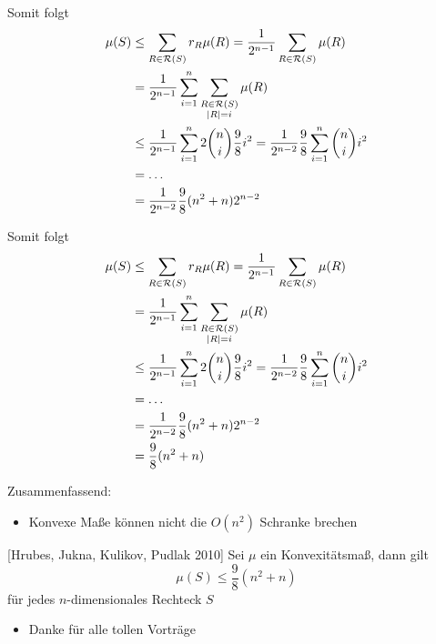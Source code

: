 \begin{frame}[t, noframenumbering]{}
    Somit folgt
    \begin{align*}
        \mu(S) &\leq \sum_{R \in \mathcal{R}(S)} r_R \mu(R)= \frac{1}{2^{n-1}} \sum_{R \in \mathcal{R}(S)} \mu(R)\\
        &= \frac{1}{2^{n-1}} \sum_{i=1}^n \sum_{\substack{R \in \mathcal{R}(S)\\|R| = i}} \strut\mu(R)\\
        &\leq \frac{1}{2^{n-1}} \sum_{i=1}^n 2 \binom{n}{i} \strut\dfrac{9}{8} i^2 = \frac{1}{2^{n-2}} \frac{9}{8} \sum_{i=1}^n \binom{n}{i} i^2\\
        &= \dots\\
        &= \frac{1}{2^{n-2}} \frac{9}{8} (n^2 + n) 2^{n-2}
    \end{align*}
\end{frame}

\begin{frame}[t, noframenumbering]{}
    Somit folgt
    \begin{align*}
        \mu(S) &\leq \sum_{R \in \mathcal{R}(S)} r_R \mu(R)= \frac{1}{2^{n-1}} \sum_{R \in \mathcal{R}(S)} \mu(R)\\
        &= \frac{1}{2^{n-1}} \sum_{i=1}^n \sum_{\substack{R \in \mathcal{R}(S)\\|R| = i}} \strut\mu(R)\\
        &\leq \frac{1}{2^{n-1}} \sum_{i=1}^n 2 \binom{n}{i} \strut\dfrac{9}{8} i^2 = \frac{1}{2^{n-2}} \frac{9}{8} \sum_{i=1}^n \binom{n}{i} i^2\\
        &= \dots\\
        &= \frac{1}{2^{n-2}} \frac{9}{8} (n^2 + n) 2^{n-2} \\
        &= \frac{9}{8} (n^2+n)
    \end{align*}
\end{frame}


\begin{frame}{Zusammenfassend:}
    \begin{itemize}
        \item Konvexe Ma\ss{}e k\"onnen nicht die $O(n^2)$ Schranke brechen
    \end{itemize}
    \pause
    \begin{block}{[Hrubes, Jukna, Kulikov, Pudlak 2010]}
        Sei $\mu$ ein Konvexit\"atsma\ss{}, dann gilt
        \[
            \mu(S) \leq \frac{9}{8} (n^2+n)
        \]
        f\"ur jedes $n$-dimensionales Rechteck $S$
    \end{block}
    \pause
    \begin{itemize}
        \item Danke f\"ur alle tollen Vortr\"age
    \end{itemize}
\end{frame}